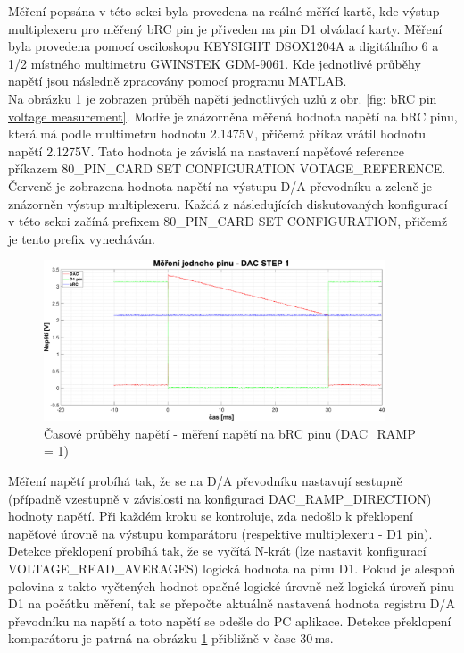 Měření popsána v této sekci byla provedena na reálné měřící kartě, kde výstup multiplexeru pro měřený bRC pin je přiveden na pin D1 olvádací karty. Měření byla provedena pomocí
osciloskopu KEYSIGHT DSOX1204A a digitálního 6 a 1/2 místného multimetru GWINSTEK GDM-9061.
Kde jednotlivé průběhy napětí jsou následně zpracovány pomocí programu MATLAB.\\

Na obrázku \ref{fig: bRC pin voltage measurement DACRAMP1} je zobrazen průběh napětí jednotlivých uzlů z obr. \ref{fig: bRC pin voltage measurement}. Modře je znázorněna měřená hodnota napětí na bRC pinu,
která má podle multimetru hodnotu 2.1475V, přičemž příkaz vrátil hodnotu napětí 2.1275V. Tato hodnota je závislá na nastavení napěťové reference příkazem 80\_PIN\_CARD SET CONFIGURATION VOTAGE\_REFERENCE.\\

Červeně je zobrazena hodnota napětí na výstupu D/A převodníku a zeleně je znázorněn výstup multiplexeru. 
Každá z následujících diskutovaných konfigurací v této sekci začíná prefixem 80\_PIN\_CARD SET CONFIGURATION, přičemž je tento prefix vynecháván.

\begin{figure}[ht!]
    \centering
    \includegraphics[width = 0.9\textwidth]{obrazky/matlab_generated/pin_step1.eps}
    \caption{Časové průběhy napětí - měření napětí na bRC pinu (DAC\_RAMP = 1)}
    \label{fig: bRC pin voltage measurement DACRAMP1}
\end{figure}

Měření napětí probíhá tak, že se na D/A převodníku nastavují sestupně (případně vzestupně v závislosti na konfiguraci DAC\_RAMP\_DIRECTION) hodnoty napětí. Při každém kroku se kontroluje,
zda nedošlo k překlopení napěťové úrovně na výstupu komparátoru (respektive multiplexeru - D1 pin).
Detekce překlopení probíhá tak, že se vyčítá N-krát (lze nastavit konfigurací VOLTAGE\_READ\_AVERAGES) logická hodnota na pinu D1.
Pokud je alespoň polovina z takto vyčtených hodnot opačné logické úrovně než logická úroveň pinu D1 na počátku měření,
tak se přepočte aktuálně nastavená hodnota registru D/A převodníku na napětí a toto napětí se odešle do PC aplikace.
Detekce překlopení komparátoru je patrná na obrázku \ref{fig: bRC pin voltage measurement DACRAMP1}
přibližně v čase 30\,ms.

